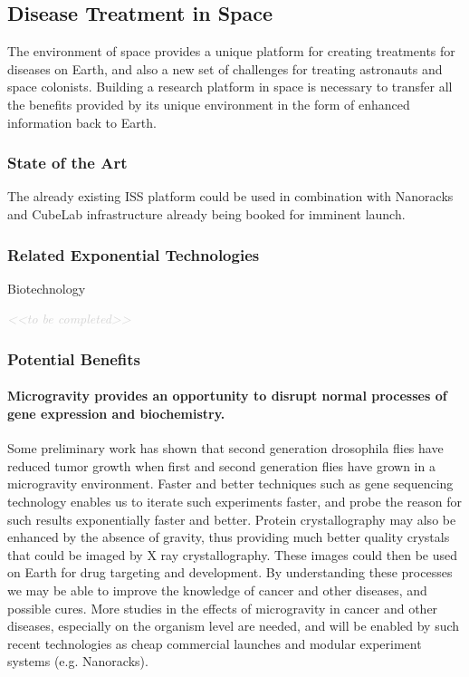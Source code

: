 \documentclass[letter,11pt]{article}
\newcommand{\todo}[1]{\textcolor{lightgray}{\textit{<<#1>>}}}
\newcommand{\tbc}{\begin{center} \todo{to be completed} \end{center}}
\begin{document}
\subsection{Disease Treatment in Space}

The environment of space provides a unique platform for creating treatments for
diseases on Earth, and also a new set of challenges for treating astronauts and
space colonists. Building a research platform in space is necessary to transfer
all the benefits provided by its unique environment in the form of enhanced
information back to Earth.

\subsubsection{State of the Art}
The already existing ISS platform could be used in combination with Nanoracks
and CubeLab infrastructure already being booked for imminent launch.

\subsubsection{Related Exponential Technologies}

Biotechnology
\tbc

\subsubsection{Potential Benefits}

\paragraph{Microgravity provides an opportunity to disrupt normal processes of gene expression and biochemistry.} Some preliminary work has shown that second generation drosophila flies have reduced tumor growth when first and second generation flies have grown in a microgravity environment. Faster and better techniques such as gene sequencing technology enables us to iterate such experiments faster, and probe the reason for such results exponentially faster and better. Protein crystallography may also be enhanced by the absence of gravity, thus providing much better quality crystals that could be imaged by X ray crystallography. These images could then be used on Earth for drug targeting and development. By understanding these processes we may be able to improve the knowledge of cancer and other diseases, and possible cures. More studies in the effects of microgravity in cancer and other diseases, especially on the organism level are needed, and will be enabled by such recent technologies as cheap commercial launches and modular experiment systems (e.g. Nanoracks).
\end{document}
